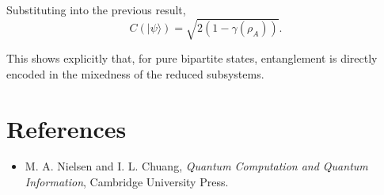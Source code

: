 \documentclass[a4paper]{article}
\begin{document}
Substituting into the previous result,
\[
C(|\psi\rangle)
=
\sqrt{2\left(1 - \gamma(\rho_A)\right)}.
\]

This shows explicitly that, for pure bipartite states, entanglement is directly encoded in the mixedness of the reduced subsystems.
\section{References}

\begin{itemize}
    \item M. A. Nielsen and I. L. Chuang, \textit{Quantum Computation and Quantum Information}, Cambridge University Press.
\end{itemize}
\end{document}
